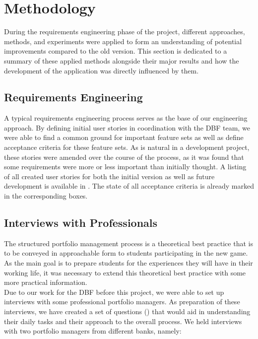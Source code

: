 \section{Methodology}
\label{sec:methodology}

During the requirements engineering phase of the project, different approaches, methods, and experiments were applied to form an understanding of potential improvements compared to the old version. This section is dedicated to a summary of these applied methods alongside their major results and how the development of the application was directly influenced by them.


\subsection{Requirements Engineering}
A typical requirements engineering process serves as the base of our engineering approach. By defining initial user stories in coordination with the DBF team, we were able to find a common ground for important feature sets as well as define acceptance criteria for these feature sets. As is natural in a development project, these stories were amended over the course of the process, as it was found that some requirements were more or less important than initially thought. A listing of all created user stories for both the initial version as well as future development is available in . The state of all acceptance criteria is already marked in the corresponding boxes.


\subsection{Interviews with Professionals}
The structured portfolio management process is a theoretical best practice that is to be conveyed in approachable form to students participating in the new game. As the main goal is to prepare students for the experiences they will have in their working life, it was necessary to extend this theoretical best practice with some more practical information. \\

Due to our work for the DBF before this project, we were able to set up interviews with some professional portfolio managers. As preparation of these interviews, we have created a set of questions () that would aid in understanding their daily tasks and their approach to the overall process. We held interviews with two portfolio managers from different banks, namely:

